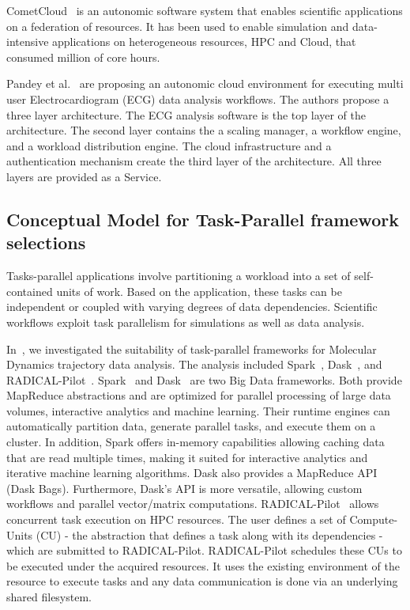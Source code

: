 CometCloud~\cite{diazmontes2015cometcloud} is an autonomic software system that enables scientific applications on a federation of resources. It has been used to enable simulation and data-intensive applications on heterogeneous resources, HPC and Cloud, that consumed million of core hours.

Pandey et al.~\cite{pandey2012autonomic} are proposing an autonomic cloud environment for executing multi user Electrocardiogram (ECG) data analysis workflows. The authors propose a three layer architecture. The ECG analysis software is the top layer of the architecture. The second layer contains the a scaling manager, a workflow engine, and a workload distribution engine. The cloud infrastructure and a authentication mechanism create the third layer of the architecture. All three layers are provided as a Service.  

\subsection{Conceptual Model for Task-Parallel framework selections}
Tasks-parallel applications involve partitioning a workload into a set of self-contained units of work. Based on the application, these tasks can be independent or coupled with varying degrees of data dependencies. Scientific workflows exploit task parallelism for simulations as well as data analysis.

In~\cite{paraskevakos2018task}, we investigated the suitability of task-parallel frameworks for Molecular Dynamics trajectory data analysis. The analysis included Spark~\cite{zaharia2010spark}, Dask~\cite{rocklin2015dask}, and RADICAL-Pilot~\cite{merzky2019using}. Spark~\cite{zaharia2010spark} and Dask~\cite{rocklin2015dask} are two Big Data frameworks. Both provide MapReduce abstractions and are optimized for parallel processing of large data volumes, interactive analytics and machine learning. Their runtime engines can automatically partition data, generate parallel tasks, and execute them on a cluster. In addition, Spark offers in-memory capabilities allowing caching data that are read multiple times, making it suited for interactive analytics and iterative machine learning algorithms. Dask also provides a MapReduce API (Dask Bags). Furthermore, Dask’s API is more versatile, allowing custom workflows and parallel vector/matrix computations. RADICAL-Pilot~\cite{merzky2019using} allows concurrent task execution on HPC resources. The user defines a set of Compute-Units (CU) - the abstraction that defines a task along with its dependencies - which are submitted to RADICAL-Pilot. RADICAL-Pilot schedules these CUs to be executed under the acquired resources. It uses the existing environment of the resource to execute tasks and any data communication is done via an underlying shared filesystem.


